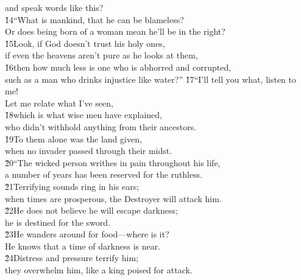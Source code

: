 \begin{poetry}
\poemll    and speak words like this? \\
\poeml \v{14}``What is mankind, that he can be blameless? \\
\poemll    Or does being born of a woman mean he'll be in the right? \\
\poeml \v{15}Look, if God doesn't trust his holy ones, \\
\poemll    if even the heavens aren't pure as he looks at them, \\
\poeml \v{16}then how much less is one who is abhorred and corrupted, \\
\poemll    such as a man who drinks injustice like water?''
\poeml \v{17}``I'll tell you what, listen to me! \\
\poemll    Let me relate what I've seen, \\
\poeml \v{18}which is what wise men have explained, \\
\poemll    who didn't withhold anything from their ancestors. \\
\poeml \v{19}To them alone was the land given, \\
\poemll    when no invader passed through their midst. \\
\poeml \v{20}``The wicked person writhes in pain throughout his life, \\
\poemll    a number of years has been reserved for the ruthless. \\
\poeml \v{21}Terrifying sounds ring in his ears; \\
\poemll    when times are prosperous, the Destroyer will attack him. \\
\poeml \v{22}He does not believe he will escape darkness; \\
\poemll    he is destined for the sword. \\
\poeml \v{23}He wanders around for food---where is it? \\
\poemll    He knows that a time of darkness is near. \\
\poeml \v{24}Distress and pressure terrify him; \\
\poemll    they overwhelm him, like a king poised for attack. \\

\end{poetry}
